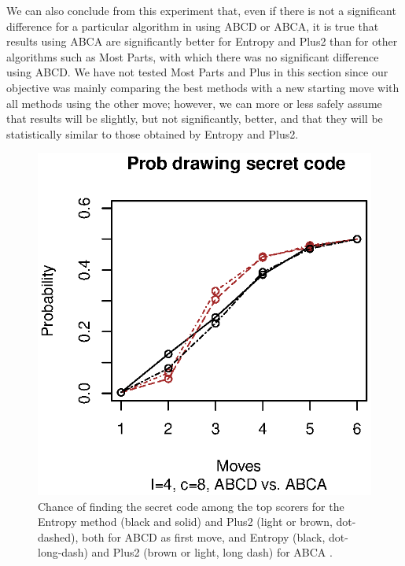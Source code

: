 \documentclass[preprint,12pt]{elsarticle}
\begin{document}
We can also conclude from this experiment that, even if there is not a
significant difference for a particular algorithm in using ABCD or
ABCA, it is true that results using ABCA are significantly better for
Entropy and Plus2 than for other algorithms such as Most Parts, with
which there was no significant difference using ABCD. We have not
tested Most Parts and Plus in this section since our objective was
mainly comparing the best methods with a new starting move with all
methods using the other move; however, we can more or less safely
assume that results will be slightly, but not significantly, better,
and that they will be statistically similar to those obtained by
Entropy and Plus2. 
%
\begin{figure}[!htb]
\centering
\includegraphics{prob-abca-48.eps}
\caption{Chance of finding the secret code among the top scorers for the
  Entropy method (black and solid) and Plus2 (light or
  brown, dot-dashed), both for ABCD as first move, and Entropy (black,
  dot-long-dash) and Plus2 (brown or light, long dash) for ABCA .\label{fig:prob:abca:48}} 
\end{figure} 
\end{document}
